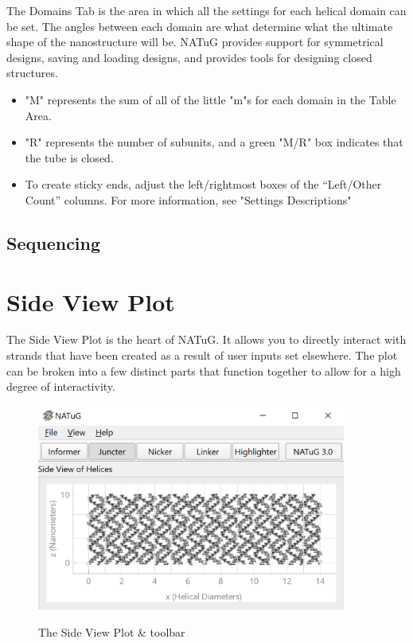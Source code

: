 \documentclass[titlepage]{article}
\begin{document}
	The Domains Tab is the area in which all the settings for each helical domain can be set. The angles between each domain are what determine what the ultimate shape of the nanostructure will be. NATuG provides support for symmetrical designs, saving and loading designs, and provides tools for designing closed structures.
	
	\begin{itemize}
		\item "M" represents the sum of all of the little "m"s for each domain in the Table Area.
		\item "R" represents the number of subunits, and a green "M/R" box indicates that the tube is closed.
		\item To create sticky ends, adjust the left/rightmost boxes of the “Left/Other Count” columns. For more information, see "Settings Descriptions"
	\end{itemize}
	
	\subsection{Sequencing}
	
	\section{Side View Plot}
	The Side View Plot is the heart of NATuG. It allows you to directly interact with strands that have been created as a result of user inputs set elsewhere. The plot can be broken into a few distinct parts that function together to allow for a high degree of interactivity. 
	
	\begin{figure}[h]
		\centering
		\caption{The Side View Plot \& toolbar}
		\includegraphics[width=4in]{short-side-view-overview.png}
		\label{fig:short-side-view-overview}
	\end{figure}
\end{document}
